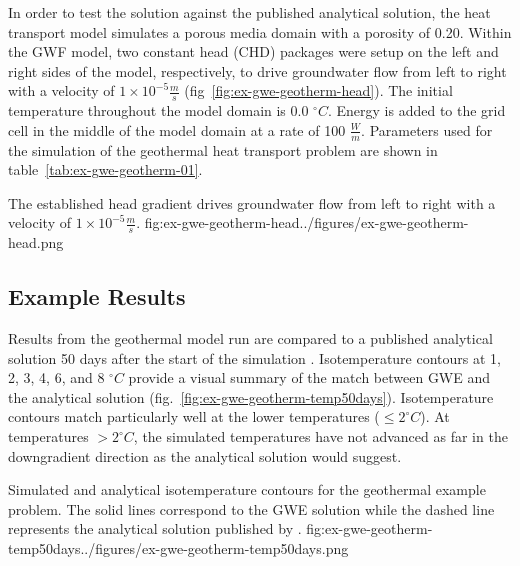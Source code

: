 In order to test the \mf solution against the published analytical solution, the heat transport model simulates a porous media domain with a porosity of 0.20. Within the GWF model, two constant head (CHD) packages were setup on the left and right sides of the model, respectively, to drive groundwater flow from left to right with a velocity of $1 \times 10^{-5} \tfrac{m}{s}$ (fig~\ref{fig:ex-gwe-geotherm-head}).  The initial temperature throughout the model domain is 0.0 $^{\circ}C$. Energy is added to the grid cell in the middle of the model domain at a rate of 100 $\tfrac{W}{m}$.  Parameters used for the \mf simulation of the geothermal heat transport problem are shown in table~\ref{tab:ex-gwe-geotherm-01}.



\begin{StandardFigure}{
    The established head gradient drives groundwater flow from left to right with a velocity of $1 \times 10^{-5} \tfrac{m}{s}$.}
    {fig:ex-gwe-geotherm-head}{../figures/ex-gwe-geotherm-head.png}
\end{StandardFigure}            

\subsection{Example Results}

Results from the geothermal model run are compared to a published analytical solution 50 days after the start of the simulation \citep{alKhoury2021}.  Isotemperature contours at 1, 2, 3, 4, 6, and 8 $^{\circ}C$ provide a visual summary of the match between GWE and the analytical solution (fig.~\ref{fig:ex-gwe-geotherm-temp50days}).  Isotemperature contours match particularly well at the lower temperatures ($\leq 2 ^{\circ}C$).  At temperatures  $>2^{\circ}C$, the simulated temperatures have not advanced as far in the downgradient direction as the analytical solution would suggest. 

\begin{StandardFigure}{
    Simulated and analytical isotemperature contours for the geothermal example problem.  The solid lines correspond to the GWE solution while the dashed line represents the analytical solution published by \cite{alKhoury2021}.}
    {fig:ex-gwe-geotherm-temp50days}{../figures/ex-gwe-geotherm-temp50days.png}
\end{StandardFigure}                                 
